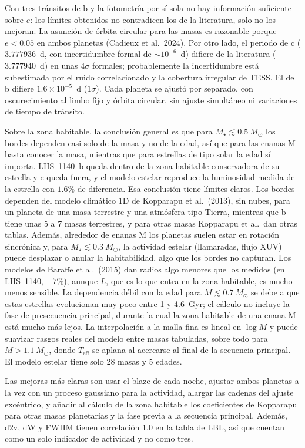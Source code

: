 \documentclass[twocolumn,aps,pra,11pt]{revtex4-2}
\newcommand{\Msun}{\ensuremath{M_\odot}}
\begin{document}
Con tres tránsitos de b y la fotometría por sí sola no hay información suficiente sobre $e$: los límites obtenidos no contradicen los de la literatura, solo no los mejoran. La asunción de órbita circular para las masas es razonable porque $e < 0.05$ en ambos planetas (Cadieux et al.\ 2024). Por otro lado, el periodo de c ($3.777936$~d, con incertidumbre formal de $\sim 10^{-6}$~d) difiere de la literatura ($3.777940$~d) en unas $4\sigma$ formales; probablemente la incertidumbre está subestimada por el ruido correlacionado y la cobertura irregular de TESS. El de b difiere $1.6 \times 10^{-5}$~d ($1\sigma$). Cada planeta se ajustó por separado, con oscurecimiento al limbo fijo y órbita circular, sin ajuste simultáneo ni variaciones de tiempo de tránsito.

Sobre la zona habitable, la conclusión general es que para $M_\star \lesssim 0.5~\Msun$ los bordes dependen casi solo de la masa y no de la edad, así que para las enanas M basta conocer la masa, mientras que para estrellas de tipo solar la edad sí importa. LHS~1140~b queda dentro de la zona habitable conservadora de su estrella y c queda fuera, y el modelo estelar reproduce la luminosidad medida de la estrella con $1.6\%$ de diferencia. Esa conclusión tiene límites claros. Los bordes dependen del modelo climático 1D de Kopparapu et al.\ (2013), sin nubes, para un planeta de una masa terrestre y una atmósfera tipo Tierra, mientras que b tiene unas 5 a 7 masas terrestres, y para otras masas Kopparapu et al.\ dan otras tablas. Además, alrededor de enanas M los planetas suelen estar en rotación sincrónica y, para $M_\star \lesssim 0.3~\Msun$, la actividad estelar (llamaradas, flujo XUV) puede desplazar o anular la habitabilidad, algo que los bordes no capturan. Los modelos de Baraffe et al.\ (2015) dan radios algo menores que los medidos (en LHS~1140, $-7\%$), aunque $L$, que es lo que entra en la zona habitable, es mucho menos sensible. La dependencia débil con la edad para $M \lesssim 0.7~\Msun$ se debe a que estas estrellas evolucionan muy poco entre 1 y 4.6~Gyr; el cálculo no incluye la fase de presecuencia principal, durante la cual la zona habitable de una enana M está mucho más lejos. La interpolación a la malla fina es lineal en $\log M$ y puede suavizar rasgos reales del modelo entre masas tabuladas, sobre todo para $M > 1.1~\Msun$, donde $T_\mathrm{eff}$ se aplana al acercarse al final de la secuencia principal. El modelo estelar tiene solo 28 masas y 5 edades.

Las mejoras más claras son usar el blaze de cada noche, ajustar ambos planetas a la vez con un proceso gaussiano para la actividad, alargar las cadenas del ajuste excéntrico, y añadir al cálculo de la zona habitable los coeficientes de Kopparapu para otras masas planetarias y la fase previa a la secuencia principal. Además, d2v, dW y FWHM tienen correlación 1.0 en la tabla de LBL, así que cuentan como un solo indicador de actividad y no como tres.
\end{document}
